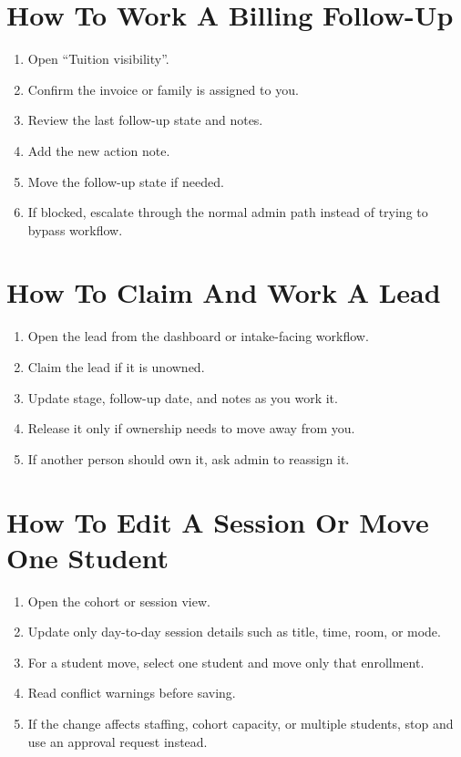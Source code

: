 \documentclass[11pt]{article}
\begin{document}
\section*{How To Work A Billing Follow-Up}
\begin{enumerate}
  \item Open ``Tuition visibility''.
  \item Confirm the invoice or family is assigned to you.
  \item Review the last follow-up state and notes.
  \item Add the new action note.
  \item Move the follow-up state if needed.
  \item If blocked, escalate through the normal admin path instead of trying to bypass workflow.
\end{enumerate}

\section*{How To Claim And Work A Lead}
\begin{enumerate}
  \item Open the lead from the dashboard or intake-facing workflow.
  \item Claim the lead if it is unowned.
  \item Update stage, follow-up date, and notes as you work it.
  \item Release it only if ownership needs to move away from you.
  \item If another person should own it, ask admin to reassign it.
\end{enumerate}

\section*{How To Edit A Session Or Move One Student}
\begin{enumerate}
  \item Open the cohort or session view.
  \item Update only day-to-day session details such as title, time, room, or mode.
  \item For a student move, select one student and move only that enrollment.
  \item Read conflict warnings before saving.
  \item If the change affects staffing, cohort capacity, or multiple students, stop and use an approval request instead.
\end{enumerate}
\end{document}
